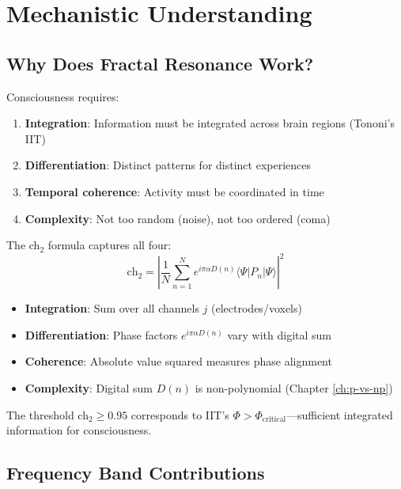 \section{Mechanistic Understanding}

\subsection{Why Does Fractal Resonance Work?}

\begin{level3}
Consciousness requires:
\begin{enumerate}
\item \textbf{Integration}: Information must be integrated across brain regions (Tononi's IIT\cite{tononi2016})
\item \textbf{Differentiation}: Distinct patterns for distinct experiences
\item \textbf{Temporal coherence}: Activity must be coordinated in time
\item \textbf{Complexity}: Not too random (noise), not too ordered (coma)
\end{enumerate}

The ch$_2$ formula captures all four:
\begin{equation}
\text{ch}_2 = \left|\frac{1}{N} \sum_{n=1}^{N} e^{i\pi\alpha D(n)} \langle \Psi | P_n | \Psi \rangle\right|^2
\end{equation}

\begin{itemize}
\item \textbf{Integration}: Sum over all channels $j$ (electrodes/voxels)
\item \textbf{Differentiation}: Phase factors $e^{i\pi\alpha D(n)}$ vary with digital sum
\item \textbf{Coherence}: Absolute value squared measures phase alignment
\item \textbf{Complexity}: Digital sum $D(n)$ is non-polynomial (Chapter \ref{ch:p-vs-np})
\end{itemize}

The threshold ch$_2 \geq 0.95$ corresponds to IIT's $\Phi > \Phi_{\text{critical}}$—sufficient integrated information for consciousness\cite{tononi2016}.
\end{level3}

\subsection{Frequency Band Contributions}

